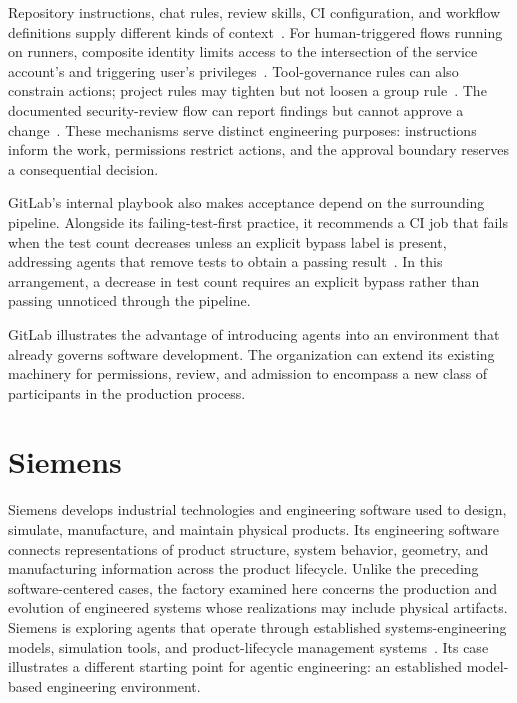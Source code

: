 
Repository instructions, chat rules, review skills, CI configuration, and workflow definitions supply different kinds of context~\citep{gitlab2026customize}. For human-triggered flows running on runners, composite identity limits access to the intersection of the service account's and triggering user's privileges~\citep{gitlab2026identity}. Tool-governance rules can also constrain actions; project rules may tighten but not loosen a group rule~\citep{gitlab2026toolgovernance}. The documented security-review flow can report findings but cannot approve a change~\citep{gitlab2026securityreview}. These mechanisms serve distinct engineering purposes: instructions inform the work, permissions restrict actions, and the approval boundary reserves a consequential decision.

GitLab's internal playbook also makes acceptance depend on the surrounding pipeline. Alongside its failing-test-first practice, it recommends a CI job that fails when the test count decreases unless an explicit bypass label is present, addressing agents that remove tests to obtain a passing result~\citep{gitlab2026playbook}. In this arrangement, a decrease in test count requires an explicit bypass rather than passing unnoticed through the pipeline.

GitLab illustrates the advantage of introducing agents into an environment that already governs software development. The organization can extend its existing machinery for permissions, review, and admission to encompass a new class of participants in the production process.

\section{Siemens}\label{heading:siemens}

Siemens develops industrial technologies and engineering software used to design, simulate, manufacture, and maintain physical products. Its engineering software connects representations of product structure, system behavior, geometry, and manufacturing information across the product lifecycle. Unlike the preceding software-centered cases, the factory examined here concerns the production and evolution of engineered systems whose realizations may include physical artifacts. Siemens is exploring agents that operate through established systems-engineering models, simulation tools, and product-lifecycle management systems~\citep{liu2024agentstudio,siemens2026a3e,haines2026bomagent}. Its case illustrates a different starting point for agentic engineering: an established model-based engineering environment.

